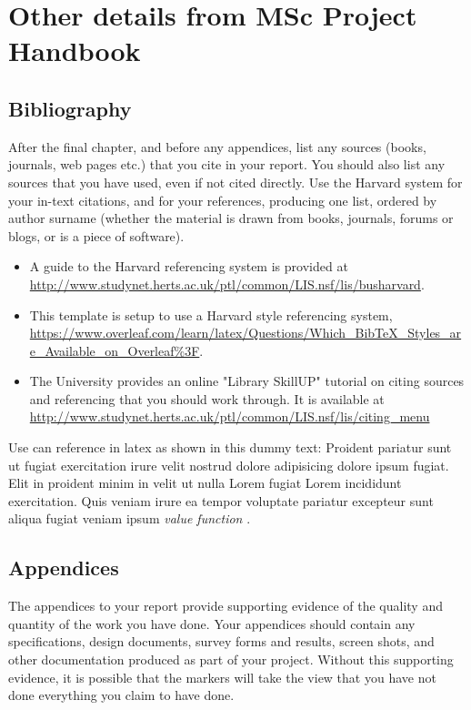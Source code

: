 \documentclass[a4paper, notitlepage, 11pt]{article}
\begin{document}
\section{Other details from MSc Project Handbook}

\subsection{Bibliography}

After the final chapter, and before any appendices, list any sources (books, journals, web pages 
etc.) that you cite in your report. You should also list any sources that you have used, even if 
not cited directly. Use the Harvard system for your in-text citations, and for your references, 
producing  one  list,  ordered  by  author  surname  (whether  the  material  is  drawn  from  books, 
journals, forums or blogs, or is a piece of software). 
\begin{itemize}
    \item A guide to the Harvard referencing system 
is provided at \url{http://www.studynet.herts.ac.uk/ptl/common/LIS.nsf/lis/busharvard}.
    \item This template is setup to use a Harvard style referencing system, \url{https://www.overleaf.com/learn/latex/Questions/Which_BibTeX_Styles_are_Available_on_Overleaf%3F}.
    \item The University provides an online "Library SkillUP" tutorial on citing sources and 
referencing that you should work through. It is available at 
\url{http://www.studynet.herts.ac.uk/ptl/common/LIS.nsf/lis/citing_menu }
\end{itemize}

Use can reference in latex as shown in this dummy text: Proident pariatur sunt ut fugiat exercitation irure velit nostrud dolore adipisicing dolore ipsum fugiat. Elit in proident minim in velit ut nulla Lorem fugiat Lorem incididunt exercitation. Quis veniam irure ea tempor voluptate pariatur excepteur sunt aliqua fugiat veniam ipsum \emph{value function}  \citep{Sutton2018}.

\subsection{Appendices}

The appendices to your report provide supporting evidence of the quality and quantity of the 
work you have done. Your appendices should contain any specifications, design documents, 
survey  forms  and  results,  screen  shots,  and  other  documentation  produced  as  part  of  your 
project. Without this supporting evidence, it is possible that the markers will take the view that 
you have not done everything you claim to have done.  
\end{document}
